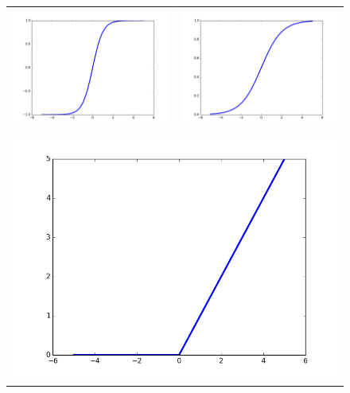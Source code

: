 \documentclass{report}
\begin{document}
\begin{figure}
\begin{center}
\begin{tabular}{cc}
\includegraphics[scale=0.25]{images/tanh.png} & \includegraphics[scale=0.25]{images/s.png} \\
\multicolumn{2}{c}{\includegraphics[scale=0.25]{images/relu.png}}

\end{tabular}
\end{center}
\end{figure}
\end{document}

